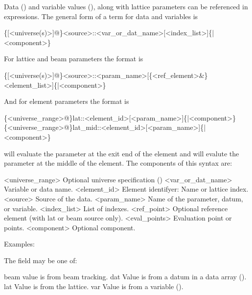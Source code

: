 Data () and variable values
(), along with lattice parameters can be
referenced in expressions. The general form of a term for
data and variables is
\begin{example}
  \{[<universe(s)>]@\}<source>::<var_or_dat_name>[<index_list>]\{|<component>\}
\end{example}
For lattice and beam parameters the format is
\begin{example}
  \{[<universe(s)>]@\}<source>::<param_name>[\{<ref_element>&\}<element_list>]\{|<component>\}
\end{example}
And for element parameters the format is
\begin{example}
  \{<universe_range>@\}lat::<element_id>[<param_name>]\{|<component>\}
  \{<universe_range>@\}lat_mid::<element_id>[<param_name>]\{|<component>\}
\end{example}
 will evaluate the parameter at the exit end of the element and 
 will evalute the parameter at the middle of the element.
The components of this syntax are:
\begin{example}
  <universe_range>    Optional universe specification ()
  <var_or_dat_name>   Variable or data name.
  <element_id>        Element identifyer: Name or lattice index.
  <source>            Source of the data.
  <param_name>        Name of the parameter, datum, or variable.
  <index_list>        List of indexes.
  <ref_point>         Optional reference element (with lat or beam source only).
  <eval_points>       Evaluation point or points.
  <component>         Optional component. 
\end{example}
Examples:

The  field may be one of:
\begin{example}
  beam        value is from beam tracking.
  dat         Value is from a \tao datum in a data array ().
  lat         Value is from the lattice.
  var         Value is from a \tao variable ().
\end{example}

